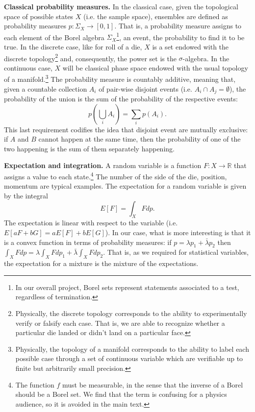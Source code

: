 \documentclass[10pt,twocolumn, nofootinbib]{revtex4-2}
\begin{document}
\textbf{Classical probability measures.} In the classical case, given the topological space of possible states $X$ (i.e. the sample space), ensembles are defined as probability measures $p : \Sigma_X \to [0,1]$. That is, a probability measure assigns to each element of the Borel algebra $\Sigma_X$\footnote{In our overall project, Borel sets represent statements associated to a test, regardless of termination.}, an event, the probability to find it to be true. In the discrete case, like for roll of a die, $X$ is a set endowed with the discrete topology\footnote{Physically, the discrete topology corresponds to the ability to experimentally verify or falsify each case. That is, we are able to recognize whether a particular die landed or didn't land on a particular face.} and, consequently, the power set is the $\sigma$-algebra. In the continuous case, $X$ will be classical phase space endowed with the usual topology of a manifold.\footnote{Physically, the topology of a manifold corresponds to the ability to label each possible case through a set of continuous variable which are verifiable up to finite but arbitrarily small precision.}  The probability measure is countably additive, meaning that, given a countable collection $A_i$ of pair-wise disjoint events (i.e. $A_i \cap A_j = \emptyset$), the probability of the union is the sum of the probability of the respective events:
\begin{equation}
	p\left(\bigcup_i A_i \right) = \sum_i p(A_i).
\end{equation}
This last requirement codifies the idea that disjoint event are mutually exclusive: if $A$ and $B$ cannot happen at the same time, then the probability of one of the two happening is the sum of them separately happening.

\textbf{Expectation and integration.} A random variable is a function $F : X \to \mathbb{R}$ that assigns a value to each state.\footnote{The function $f$ must be measurable, in the sense that the inverse of a Borel should be a Borel set. We find that the term is confusing for a physics audience, so it is avoided in the main text.} The number of the side of the die, position, momentum are typical examples. The expectation for a random variable is given by the integral
\begin{equation}
	E[F] = \int_X F dp.
\end{equation}
The expectation is linear with respect to the variable (i.e. $E[aF+bG]= aE[F]+bE[G]$). In our case, what is more interesting is that it is a convex function in terms of probability measures: if $p = \lambda p_1 + \bar{\lambda} p_2$ then $\int_X F dp = \lambda \int_X F dp_1 + \bar{\lambda} \int_X F dp_2$. That is, as we required for statistical variables, the expectation for a mixture is the mixture of the expectations.
\end{document}
